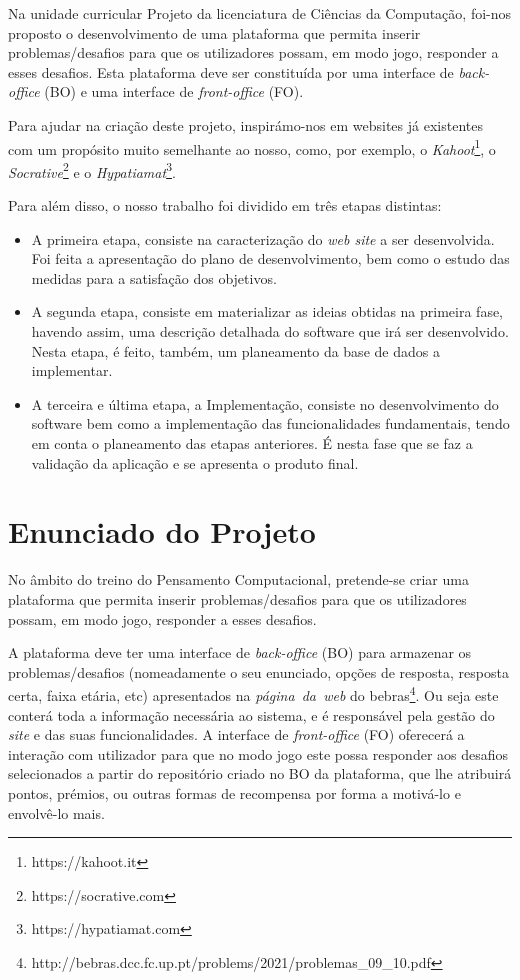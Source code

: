 \documentclass[11pt,a4paper]{report}
\begin{document}
Na unidade curricular Projeto da licenciatura de Ciências da Computação, foi-nos proposto o desenvolvimento de uma plataforma que permita inserir problemas/desafios para que os utilizadores possam, em modo jogo, responder a esses desafios. Esta plataforma deve ser constituída por uma interface de \emph{back-office} (BO) e uma interface de \emph{front-office} (FO).

Para ajudar na criação deste projeto, inspirámo-nos em websites já existentes com um propósito muito semelhante ao nosso, como, por exemplo, o \emph{Kahoot}\footnote{https://kahoot.it}, o \emph{Socrative}\footnote{https://socrative.com} e o \emph{Hypatiamat}\footnote{https://hypatiamat.com}.

Para além disso, o nosso trabalho foi dividido em três etapas distintas:
\begin{itemize}
   \item A primeira etapa, consiste na caracterização do \emph{web site} a ser desenvolvida. Foi feita a apresentação do plano de desenvolvimento, bem como o estudo das medidas para a satisfação dos objetivos.
   \item A segunda etapa, consiste em materializar as ideias obtidas na primeira fase, havendo assim, uma descrição detalhada do software que irá ser desenvolvido. Nesta etapa, é feito, também, um planeamento da base de dados a implementar.
   \item A terceira e última etapa, a Implementação, consiste no desenvolvimento do software bem como a implementação das funcionalidades fundamentais, tendo em conta o planeamento das etapas anteriores. É nesta fase que se faz a validação da aplicação e se apresenta o produto final.
\end{itemize}

\chapter{Enunciado do Projeto}

No âmbito do treino do Pensamento Computacional, pretende-se criar uma plataforma que permita inserir problemas/desafios para que os utilizadores possam, em modo jogo, responder a esses desafios. 

A plataforma deve ter uma interface de \emph{back-office} (BO) para armazenar os problemas/desafios (nomeadamente o seu enunciado, opções de resposta, resposta certa, faixa etária, etc) apresentados na \emph{página\ da\ web} do bebras\footnote{http://bebras.dcc.fc.up.pt/problems/2021/problemas\_09\_10.pdf}. Ou seja este conterá toda a informação necessária ao sistema, e é responsável pela gestão do \emph{site} e das suas funcionalidades. A interface de \emph{front-office} (FO) oferecerá a interação com utilizador para que no modo jogo este possa responder aos desafios selecionados a partir do repositório criado no BO da plataforma, que lhe atribuirá pontos, prémios, ou outras formas de recompensa por forma a motivá-lo e envolvê-lo mais.
\end{document}
